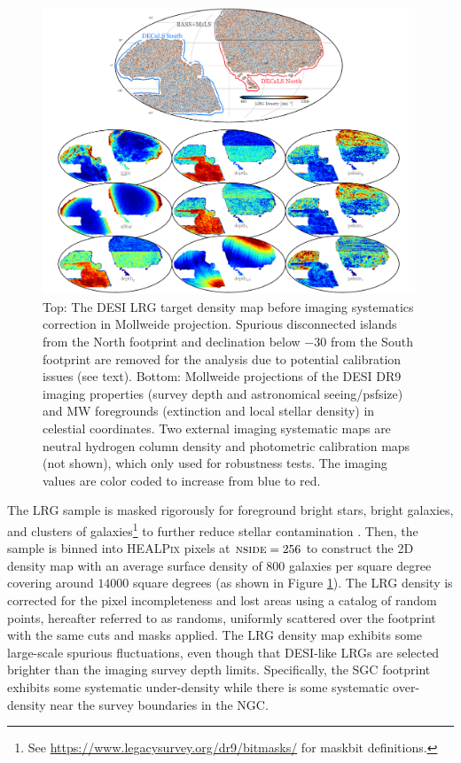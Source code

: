 \begin{figure}
 \centering
 \includegraphics[width=0.99\textwidth]{figures/dr9data.pdf}
 \caption{Top: The DESI LRG target density map before imaging systematics correction in Mollweide projection. Spurious disconnected islands from the North footprint and declination below $-30$ from the South footprint are removed for the analysis due to potential calibration issues (see text). Bottom: Mollweide projections of the DESI DR9 imaging properties (survey depth and astronomical seeing/psfsize) and MW foregrounds (extinction and local stellar density) in celestial coordinates. Two external imaging systematic maps are neutral hydrogen column density and photometric calibration maps (not shown), which only used for robustness tests. The imaging values are color coded to increase from blue to red.}
 \label{fig:ng}
\end{figure}

The LRG sample is masked rigorously for foreground bright stars, bright galaxies, and clusters of galaxies\footnote{See \url{https://www.legacysurvey.org/dr9/bitmasks/} for maskbit definitions.} to further reduce stellar contamination \citep{zhou2022target}. Then, the sample is binned into \textsc{HEALPix} \citep{gorski2005healpix} pixels at $\textsc{nside}=256$ to construct the 2D density map with an average surface density of $800$ galaxies per square degree covering around $14000$ square degrees (as shown in Figure \ref{fig:ng}). The LRG density is corrected for the pixel incompleteness and lost areas using a catalog of random points, hereafter referred to as randoms, uniformly scattered over the footprint with the same cuts and masks applied. The LRG density map exhibits some large-scale spurious fluctuations, even though that DESI-like LRGs are selected brighter than the imaging survey depth limits. Specifically, the SGC footprint exhibits some systematic under-density while there is some systematic over-density near the survey boundaries in the NGC.

